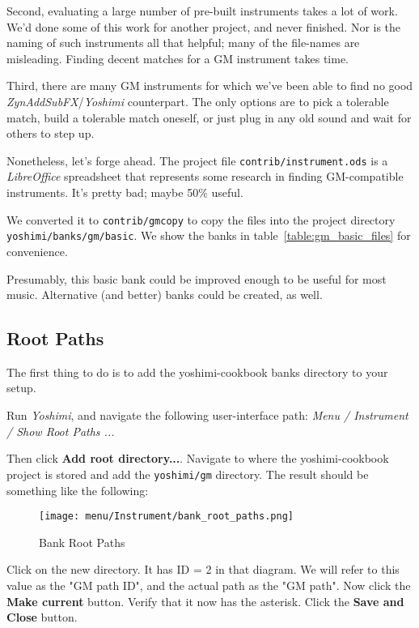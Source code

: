    Second, evaluating a large number of pre-built instruments takes a lot of
   work.  We'd done some of this work for another project, and never
   finished.  Nor is the naming of such instruments all that helpful; many
   of the file-names are misleading.  Finding decent matches for a GM
   instrument takes time.

   Third, there are many GM instruments for which we've been able to find no
   good \textsl{ZynAddSubFX}/\textsl{Yoshimi} counterpart.  The only options
   are to pick a tolerable match, build a tolerable match oneself, or just
   plug in any old sound and wait for others to step up.

   Nonetheless, let's forge ahead.  The project file
   \texttt{contrib/instrument.ods} is a \textsl{LibreOffice} spreadsheet
   that represents some research in finding GM-compatible instruments.
   It's pretty bad; maybe 50\% useful.

   We converted it to \texttt{contrib/gmcopy} to copy the files
   into the project directory \texttt{yoshimi/banks/gm/basic}.
   We show the banks in table~\ref{table:gm_basic_files}
   for convenience.



   Presumably, this basic bank could be improved enough to be useful
   for most music.  Alternative (and better) banks could be created, as
   well.

\subsection{Root Paths}
\label{subsec:cookbook_banks_root_paths}

   The first thing to do is to add the yoshimi-cookbook banks directory to 
   your setup.

   Run \textsl{Yoshimi}, and navigate the following user-interface path:
   \textsl{Menu / Instrument / Show Root Paths ...}

   Then click \textbf{Add root directory...}.  Navigate to where the
   yoshimi-cookbook project is stored and add the \texttt{yoshimi/gm}
   directory.  The result should be something like the following:

\begin{figure}[H]
   \centering 
   \texttt{[image: menu/Instrument/bank\_root\_paths.png]}
   \caption{Bank Root Paths}
   \label{fig:cookbook_bank_root_paths}
\end{figure}

   Click on the new directory.
   It has ID = 2 in that diagram.  We will refer to this value as
   the "GM path ID", and the actual path as the "GM path".
   Now click the \textbf{Make current} button.
   Verify that it now has the asterisk. 
   Click the \textbf{Save and Close} button.

